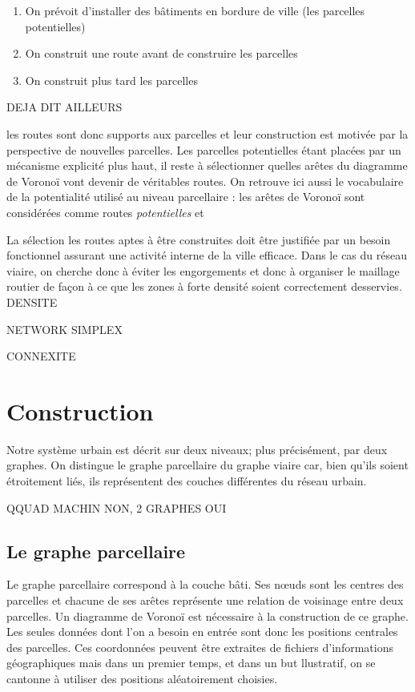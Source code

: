 \documentclass[12pt]{article}
\begin{document}
\begin{enumerate}
\item{On prévoit d'installer des bâtiments en bordure de ville (les
  parcelles potentielles)}
\item{On construit une route avant de construire les parcelles}
\item{On construit plus tard les parcelles}
\end{enumerate}

DEJA DIT AILLEURS

les routes sont donc supports aux parcelles et leur construction est
motivée par la perspective de nouvelles parcelles. Les parcelles
potentielles étant placées par un mécanisme explicité plus haut, il
reste à sélectionner quelles arêtes du diagramme de Voronoï vont
devenir de véritables routes. On retrouve ici aussi le vocabulaire de
la potentialité utilisé au niveau parcellaire : les arêtes de Voronoï
sont considérées comme routes \textit{potentielles} et

La sélection les routes aptes à être construites doit être justifiée
par un besoin fonctionnel assurant une activité interne de la ville
efficace. Dans le cas du réseau viaire, on cherche donc à éviter les
engorgements et donc à organiser le maillage routier de façon à ce que
les zones à forte densité soient correctement desservies. DENSITE

NETWORK SIMPLEX

CONNEXITE

\section{Construction}

Notre système urbain est décrit sur deux niveaux; plus précisément,
par deux graphes. On distingue le graphe parcellaire du graphe viaire
car, bien qu'ils soient étroitement liés, ils représentent des couches
différentes du réseau urbain.

QQUAD MACHIN NON, 2 GRAPHES OUI

\subsection{Le graphe parcellaire}

Le graphe parcellaire correspond à la couche bâti. Ses n\oe uds sont
les centres des parcelles et chacune de ses arêtes représente une
relation de voisinage entre deux parcelles. Un diagramme de Voronoï
est nécessaire à la construction de ce graphe. Les seules données dont
l'on a besoin en entrée sont donc les positions centrales des
parcelles. Ces coordonnées peuvent être extraites de fichiers
d'informations géographiques mais dans un premier temps, et dans un
but llustratif, on se cantonne à utiliser des positions aléatoirement
choisies.
\end{document}
